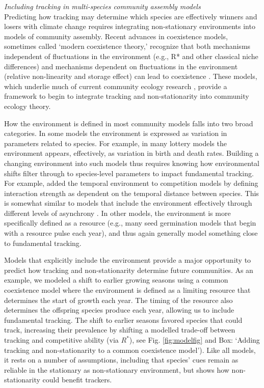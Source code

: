 \documentclass[11pt,letterpaper]{article}
\newcommand{\R}[1]{\label{#1}\linelabel{#1}}
\begin{document}
\emph{Including tracking in multi-species community assembly models} \\
Predicting how tracking may determine which species are effectively winners and losers with climate change requires integrating non-stationary environments into models of community assembly. Recent advances in coexistence models, sometimes called `modern coexistence theory,' recognize that both mechanisms independent of fluctuations in the environment (e.g., R* and other classical niche differences) and mechanisms dependent on fluctuations in the environment (relative non-linearity and storage effect) can lead to coexistence \citep{Chesson:1997dz,Chesson:2000vd}. These models, which underlie much of current community ecology research \citep{Mayfield:2010fe,barabas2018,ellner2019}, provide a framework to begin to integrate tracking and non-stationarity into community ecology theory.

How the environment is defined in most community models falls into two broad categories. In some models the environment is expressed as variation in parameters related to species. For example, in many lottery models the environment appears, effectively, as variation in birth and death rates. Building a changing environment into such models thus requires knowing how environmental shifts filter through to species-level parameters \citep{Tuljapurkar2009} to impact fundamental tracking.   For example, \citet{volkerass} added the temporal environment to competition models by defining interaction strength as dependent on the temporal distance between species. This is somewhat similar to models that include \R{doublethe}the environment effectively through different levels of asynchrony \citep[e.g.,][]{Nakazawa2012,revilla2014}. In other models, the environment is more specifically defined as a resource (e.g., many seed germination models that begin with a resource pulse each year), and thus again generally model something close to fundamental tracking. 

 Models that explicitly include the environment provide a major opportunity to predict how tracking and non-stationarity determine future communities. As an example, we modeled a shift to earlier growing seasons using a common coexistence model where the environment is defined as a limiting resource that determines the start of growth each year. The timing of the resource also determines the offspring species produce each year, allowing us to include fundamental tracking. The shift to earlier seasons favored species that could track, increasing their prevalence by shifting a modelled trade-off between tracking and competitive ability (via $R^*$), see Fig. \ref{fig:modelfig} and Box: `Adding tracking and non-stationarity to a common coexistence model'). Like all models, it rests on a number of assumptions, including that species' cues remain as reliable in the stationary as non-stationary environment, but shows how non-stationarity could benefit trackers. 
\end{document}
